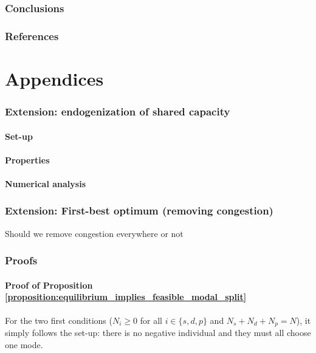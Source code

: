 \documentclass[english, a4paper]{article}
\theoremstyle{plain}
\theoremstyle{definition}
\theoremstyle{remark}
\begin{document}
\section{Conclusions}

\section{References}

\printbibliography

\part{Appendices}

\appendix

\section{Extension: endogenization of shared capacity}
\subsection{Set-up}
\subsection{Properties}
\subsection{Numerical analysis}

\section{Extension: First-best optimum (removing congestion)}
\label{appendix_sec:extension_first_best}
\alert{Should we remove congestion everywhere or not}

\section{Proofs}

\subsection{Proof of Proposition \ref{proposition:equilibrium_implies_feasible_modal_split}}
\label{proof:equilibrium_implies_feasible_modal_split}

For the two first conditions ($N_i \geq 0$ for all $i \in \{s, d, p\}$ and $N_s + N_d + N_p = N$), it simply follows the set-up: there is no negative individual and they must all choose one mode.
\end{document}
